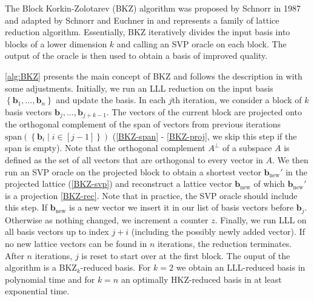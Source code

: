 The Block Korkin-Zolotarev (BKZ) algorithm was proposed by Schnorr in 1987 and adapted by Schnorr and Euchner in \cite{SE91} and represents a family of lattice reduction algorithm. Essentially, BKZ iteratively divides the input basis into blocks of a lower dimension $k$ and calling an SVP oracle on each block. The output of the oracle is then used to obtain a basis of improved quality. 

\cref{alg:BKZ} presents the main concept of BKZ and follows the description in \cite{CN11} with some adjustments. Initially, we run an LLL reduction on the input basis $\left\{\mathbf{b}_1, \dots, \mathbf{b}_{n}\right\}$ and update the basis. In each $j$th iteration, we consider a block of $k$ basis vectors $\mathbf{b}_j, \dots, \mathbf{b}_{j+k-1}$. The vectors of the current block are projected onto the orthogonal complement of the span of vectors from previous iterations $\text{span}\left(\left\{\mathbf{b}_i \mid i \in [j-1]\right\}\right)$ (\cref{BKZ-span} - \ref{BKZ-proj}, we skip this step if the span is empty). Note that the orthogonal complement $A^\perp$  of a subspace $A$ is defined as the set of all vectors that are orthogonal to every vector in $A$. We then run an SVP oracle on the projected block to obtain a shortest vector $\mathbf{b}_\text{new}'$ in the projected lattice (\cref{BKZ-svp}) and reconstruct a lattice vector $\mathbf{b}_\text{new}$ of which $\mathbf{b}_\text{new}'$ is a projection \cref{BKZ-rec}. Note that in practice, the SVP oracle should include this step. If $\mathbf{b}_\text{new}$ is a new vector we insert it in our list of basis vectors before $\mathbf{b}_j$. Otherwise as nothing changed, we increment a counter $z$. Finally, we run LLL on all basis vectors up to index $j+i$ (including the possibly newly added vector). If no new lattice vectors can be found in $n$ iterations, the reduction terminates. After $n$ iterations, $j$ is reset to start over at the first block. The ouput of the algorithm is a BKZ$_k$-reduced basis. For $k=2$ we obtain an LLL-reduced basis in polynomial time and for $k=n$ an optimally HKZ-reduced basis in at least exponential time.%


